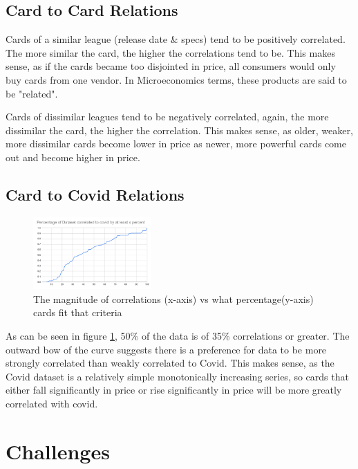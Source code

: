 \documentclass[twocolumn]{article}
\begin{document}
\subsection{Card to Card Relations}
Cards of a similar league (release date & specs) tend to be positively correlated. The more similar the card, the higher the correlations tend to be. This makes sense, as if the cards became too disjointed in price, all consumers would only buy cards from one vendor. In Microeconomics terms, these products are said to be "related".

Cards of dissimilar leagues tend to be negatively correlated, again, the more dissimilar the card, the higher the correlation. This makes sense, as older, weaker, more dissimilar cards become lower in price as newer, more powerful cards come out and become higher in price. 

\subsection{Card to Covid Relations}
\begin{figure}[h]
\centering
\includegraphics[width=0.4\textwidth]{covid_correlations }
\caption{The magnitude of correlations (x-axis) vs what percentage(y-axis) cards fit that criteria}
\label{fig:covid_correlations}
\end{figure}
As can be seen in figure \ref{fig:covid_correlations}, 50\% of the data is of 35\% correlations or greater. The outward bow of the curve suggests there is a preference for data to be more strongly correlated than weakly correlated to Covid. This makes sense, as the Covid dataset is a relatively simple monotonically increasing series, so cards that either fall significantly in price or rise significantly in price will be more greatly correlated with covid.

\section{Challenges}
\end{document}
